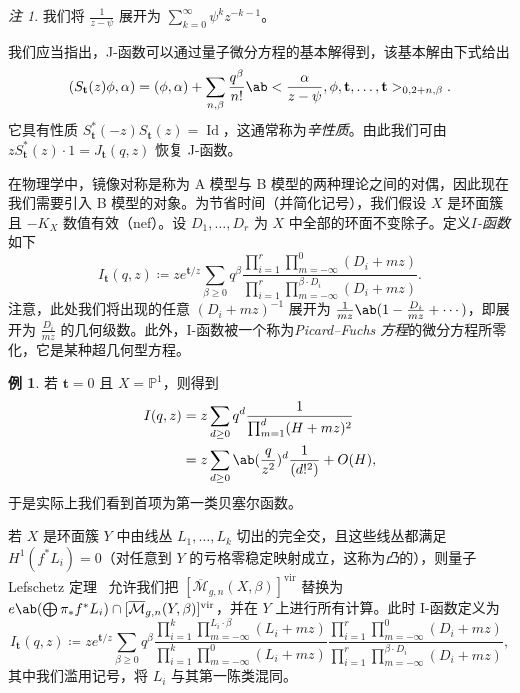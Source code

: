 \documentclass{amsart}
\theoremstyle{definition}
\newtheorem{exm}[thm]{例}
\theoremstyle{remark}
\newtheorem{rmk}[thm]{注}
\theoremstyle{plain}
\theoremstyle{definition}
\theoremstyle{remark}
\renewcommand{\P}{\mathbb{P}}
\newcommand{\Mbar}{\overline{\mathcal{M}}}
\newcommand{\mbf}[1]{\mathbf{#1}}
\newcommand{\mr}[1]{\mathrm{#1}}
\newcommand{\on}[1]{\operatorname{#1}}
\newcommand{\1}{\mathbf{1}}
\newcommand{\2}{\mathbf{2}}
\newcommand{\3}{\mathbf{3}}
\newcommand{\vir}{\mr{vir}}
\begin{document}
\begin{rmk}
    我们将 \(\frac{1}{z-\psi}\) 展开为 \(\sum_{k=0}^{\infty} \psi^k z^{-k-1}\)。  
\end{rmk}

我们应当指出，J-函数可以通过量子微分方程的基本解得到，该基本解由下式给出
\[ ( S_{\mbf{t}}(z) \phi , \alpha) = (\phi, \alpha) + \sum_{n, \beta} \frac{q^{\beta}}{n!} \ab<\frac{\alpha}{z-\psi}, \phi, \mbf{t}, \ldots, \mbf{t}>_{0, 2+n, \beta}. \]
它具有性质 \(S_{\mbf{t}}^*(-z) S_{\mbf{t}}(z) = \on{Id}\)，这通常称为\textit{辛性质}。由此我们可由 \(z S_{\mbf{t}}^*(z)\cdot 1 = J_{\mbf{t}}(q, z)\) 恢复 J-函数。

在物理学中，镜像对称是称为 A 模型与 B 模型的两种理论之间的对偶，因此现在我们需要引入 B 模型的对象。为节省时间（并简化记号），我们假设 \(X\) 是环面簇且 \(-K_X\) 数值有效（nef）。设 \(D_1, \ldots, D_r\) 为 \(X\) 中全部的环面不变除子。定义\textit{\(I\)-函数}如下
\[
    I_{\mbf{t}}(q, z) \coloneqq z e^{\mbf{t}/z} \sum_{\beta \geq 0} q^{\beta} \frac{\prod_{i=1}^r \prod_{m = -\infty}^{0} (D_i + mz)}{\prod_{i=1}^r \prod_{m=-\infty}^{\beta \cdot D_i} (D_i + mz)}.
\]
注意，此处我们将出现的任意 \((D_i + mz)^{-1}\) 展开为 \(\frac{1}{mz} \ab(1 - \frac{D_i}{mz} + \cdots)\)，即展开为 \(\frac{D_i}{mz}\) 的几何级数。此外，I-函数被一个称为\textit{Picard–Fuchs 方程}的微分方程所零化，它是某种超几何型方程。

\begin{exm}
    若 \(\mbf{t} = 0\) 且 \(X = \P^1\)，则得到
    \begin{align*}
        I(q,z) &= z\sum_{d \geq 0} q^d \frac{1}{\prod_{m=1}^d (H + mz)^2} \\
        &= z\sum_{d \geq 0} \ab(\frac{q}{z^2})^d \frac{1}{(d!^2)} + O(H),
    \end{align*}
    于是实际上我们看到首项为第一类贝塞尔函数。
\end{exm}

若 \(X\) 是环面簇 \(Y\) 中由线丛 \(L_1, \ldots, L_k\) 切出的完全交，且这些线丛都满足 \(H^1(f^* L_i) = 0\)（对任意到 \(Y\) 的亏格零稳定映射成立，这称为\textit{凸}的），则量子 Lefschetz 定理~\cite{CoatesGivental2007} 允许我们把 \([\Mbar_{g,n}(X, \beta)]^{\vir}\) 替换为 \(e\ab(\bigoplus \pi_* f^* L_i) \cap [\Mbar_{g,n}(Y, \beta)]^{\vir}\)，并在 \(Y\) 上进行所有计算。此时 I-函数定义为
\[
    I_{\mbf{t}}(q,z) \coloneqq z e^{\mbf{t}/z} \sum_{\beta \geq 0} q^{\beta} \frac{\prod_{i=1}^k \prod_{m=-\infty}^{L_i \cdot \beta} (L_i + mz)}{\prod_{i=1}^k \prod_{m=-\infty}^{0} (L_i + mz)} \frac{\prod_{i=1}^r \prod_{m = -\infty}^{0} (D_i + mz)}{\prod_{i=1}^r \prod_{m=-\infty}^{\beta \cdot D_i} (D_i + mz)},
\]
其中我们滥用记号，将 \(L_i\) 与其第一陈类混同。
\end{document}
